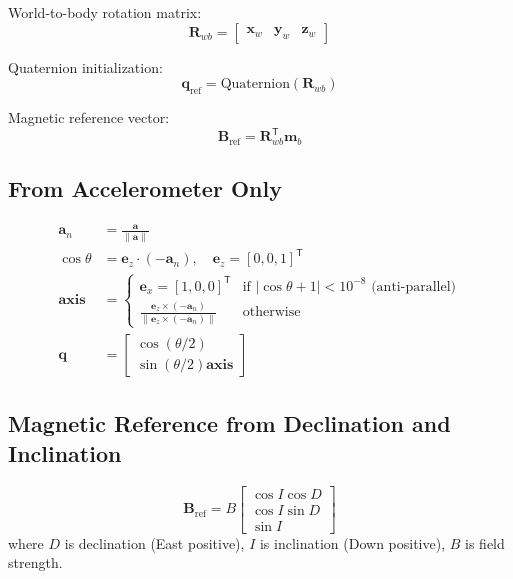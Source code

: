 \documentclass{article}
\newcommand{\vect}[1]{\bm{#1}}
\newcommand{\quat}[1]{\mathbf{#1}}
\newcommand{\T}{\mathsf{T}}
\begin{document}
World-to-body rotation matrix:
\begin{equation}
\vect{R}_{wb} = \begin{bmatrix} \vect{x}_w & \vect{y}_w & \vect{z}_w \end{bmatrix}
\end{equation}

Quaternion initialization:
\begin{equation}
\quat{q}_{\text{ref}} = \text{Quaternion}(\vect{R}_{wb})
\end{equation}

Magnetic reference vector:
\begin{equation}
\vect{B}_{\text{ref}} = \vect{R}_{wb}^\T \vect{m}_b
\end{equation}

\subsection{From Accelerometer Only}

\begin{align}
\vect{a}_n &= \frac{\vect{a}}{\|\vect{a}\|} \\
\cos\theta &= \vect{e}_z \cdot (-\vect{a}_n), \quad \vect{e}_z = [0, 0, 1]^\T \\
\vect{\text{axis}} &= 
\begin{cases}
\vect{e}_x = [1, 0, 0]^\T & \text{if } |\cos\theta + 1| < 10^{-8} \text{ (anti-parallel)} \\
\frac{\vect{e}_z \times (-\vect{a}_n)}{\|\vect{e}_z \times (-\vect{a}_n)\|} & \text{otherwise}
\end{cases} \\
\quat{q} &= 
\begin{bmatrix}
\cos(\theta/2) \\
\sin(\theta/2) \vect{\text{axis}}
\end{bmatrix}
\end{align}

\subsection{Magnetic Reference from Declination and Inclination}

\begin{equation}
\vect{B}_{\text{ref}} = B \begin{bmatrix}
\cos I \cos D \\
\cos I \sin D \\
\sin I
\end{bmatrix}
\end{equation}
where $D$ is declination (East positive), $I$ is inclination (Down positive), $B$ is field strength.
\end{document}
